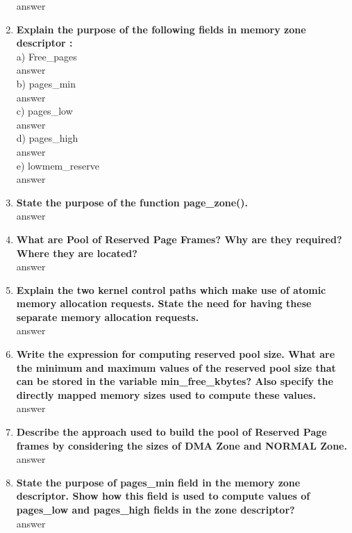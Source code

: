 \documentclass[a4paper,12pt]{article}
\begin{document}
\begin{flushleft}
\begin{enumerate}
{\color{red}answer}\\
\item \textbf{  Explain the purpose of the following fields in memory zone descriptor :}\\
a) Free\_pages \\{\color{red}answer}\\
b) pages\_min \\{\color{red}answer}\\
c) pages\_low\\{\color{red}answer}\\
d) pages\_high \\{\color{red}answer}\\
e) lowmem\_reserve\\{\color{red}answer}\\
\item \textbf{  State the purpose of the function page\_zone().}\\
{\color{red}answer}\\
\item \textbf{  What are Pool of Reserved Page Frames? Why are they required? Where they are located?}\\
{\color{red}answer}\\
\item \textbf{  Explain the two kernel control paths which make use of atomic memory allocation requests. State the need for having these separate memory allocation requests.}\\
{\color{red}answer}\\
\item \textbf{  Write the expression for computing reserved pool size. What are the minimum and maximum values of the reserved pool size that can be stored in the variable min\_free\_kbytes? Also specify the directly mapped memory sizes used to compute these values.}\\
{\color{red}answer}\\
\item \textbf{  Describe the approach used to build the pool of Reserved Page frames by considering the sizes of DMA Zone and NORMAL Zone.}\\
{\color{red}answer}\\
\item \textbf{  State the purpose of pages\_min field in the memory zone descriptor. Show how this field is used to compute values of pages\_low and pages\_high fields in the zone descriptor?}\\
{\color{red}answer}\\

\end{enumerate}
\end{flushleft}
\end{document}
